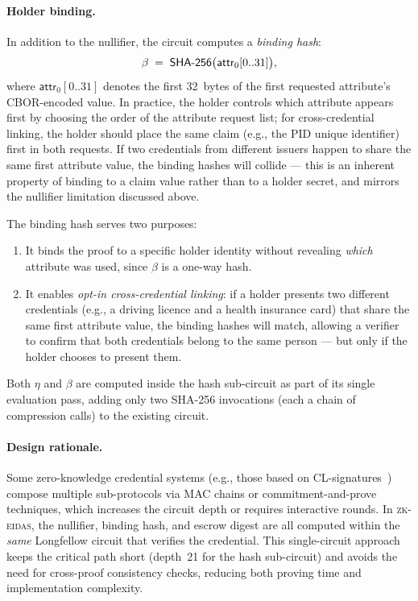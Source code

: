 \paragraph{Holder binding.}
In addition to the nullifier, the circuit computes a \emph{binding hash}:
\[
  \beta \;=\; \mathsf{SHA\textnormal{-}256}\bigl(\mathsf{attr}_0[0..31]\bigr),
\]
where $\mathsf{attr}_0[0..31]$ denotes the first 32~bytes of the first requested attribute's CBOR-encoded value.  In practice, the holder controls which attribute appears first by choosing the order of the attribute request list; for cross-credential linking, the holder should place the same claim (e.g., the PID unique identifier) first in both requests.  If two credentials from different issuers happen to share the same first attribute value, the binding hashes will collide --- this is an inherent property of binding to a claim value rather than to a holder secret, and mirrors the nullifier limitation discussed above.

The binding hash serves two purposes:
\begin{enumerate}
  \item It binds the proof to a specific holder identity without revealing \emph{which} attribute was used, since $\beta$ is a one-way hash.
  \item It enables \emph{opt-in cross-credential linking}: if a holder presents two different credentials (e.g., a driving licence and a health insurance card) that share the same first attribute value, the binding hashes will match, allowing a verifier to confirm that both credentials belong to the same person --- but only if the holder chooses to present them.
\end{enumerate}

Both $\eta$ and $\beta$ are computed inside the hash sub-circuit as part of its single evaluation pass, adding only two SHA-256 invocations (each a chain of compression calls) to the existing circuit.

\paragraph{Design rationale.}
Some zero-knowledge credential systems (e.g., those based on CL-signatures~\cite{camenisch2001}) compose multiple sub-protocols via MAC chains or commitment-and-prove techniques, which increases the circuit depth or requires interactive rounds.  In \textsc{zk-eidas}, the nullifier, binding hash, and escrow digest are all computed within the \emph{same} Longfellow circuit that verifies the credential.  This single-circuit approach keeps the critical path short (depth~21 for the hash sub-circuit) and avoids the need for cross-proof consistency checks, reducing both proving time and implementation complexity.
